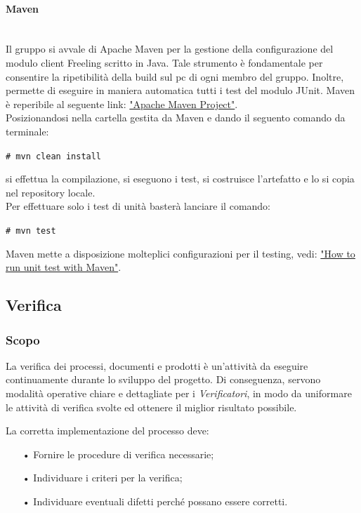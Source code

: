 {\paragraph{Maven}\mbox{}\\
Il gruppo \gruppo  
si avvale di Apache Maven per la gestione della configurazione del modulo client Freeling scritto in Java. Tale strumento è fondamentale per consentire la ripetibilità della build sul pc di ogni membro del gruppo. Inoltre, permette di eseguire in maniera automatica tutti i test del modulo JUnit. Maven è reperibile al seguente link: \href{https://maven.apache.org/}{"Apache Maven Project"}. 
\\
Posizionandosi nella cartella gestita da Maven e dando il seguento comando da terminale: 
\begin{center}
\texttt{\# mvn clean install}
\end{center}
si effettua la compilazione, si eseguono i test, si costruisce l’artefatto e lo si copia nel
repository locale.
\\
Per effettuare solo i test di unità basterà lanciare il comando: 
\begin{center}
\texttt{\# mvn test}
\end{center} 
Maven mette a disposizione molteplici configurazioni per il testing, vedi: 
\href{https://www.mkyong.com/maven/how-to-run-unit-test-with-maven/}{"How to run unit test with Maven"}.

\subsection{Verifica}

\subsubsection{Scopo}

La verifica dei processi, documenti e prodotti è un'attività da eseguire continuamente durante lo sviluppo del progetto. Di conseguenza, servono modalità operative chiare e dettagliate per i \textit{Verificatori}, in modo da uniformare le attività di verifica svolte ed ottenere il miglior risultato possibile. 

La corretta implementazione del processo deve:
\begin{itemize}
\item[•] Fornire le procedure di verifica necessarie; 
\item[•] Individuare i criteri per la verifica; 
\item[•] Individuare eventuali difetti perché possano essere corretti.
\end{itemize}

}
